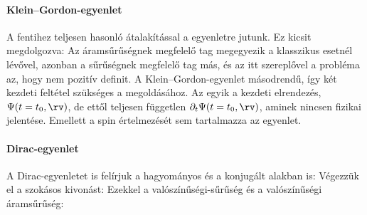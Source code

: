    \paragraph{Klein--Gordon-egyenlet}
    
    A fentihez teljesen hasonló átalakítással a
    egyenletre jutunk.
   Ez kicsit megdolgozva:
    Az áramsűrűségnek megfelelő tag megegyezik a klasszikus esetnél lévővel, azonban a sűrűségnek megfelelő tag más, és az itt szereplővel a probléma az, hogy nem pozitív definit.
   A Klein--Gordon-egyenlet másodrendű, így két kezdeti feltétel szükséges a megoldásához.
   Az egyik a kezdeti elrendezés, $\Psi(t=t_0,\rv)$, de ettől teljesen független $\partial_t\Psi(t=t_0,\rv)$, aminek nincsen fizikai jelentése.
   Emellett a spin értelmezését sem tartalmazza az egyenlet.
    
   \paragraph{Dirac-egyenlet}
    
    A Dirac-egyenletet is felírjuk a hagyományos és a konjugált alakban is:
    Végezzük el a szokásos kivonást:
    Ezekkel a valószínűségi-sűrűség és a valószínűségi áramsűrűség:
    
